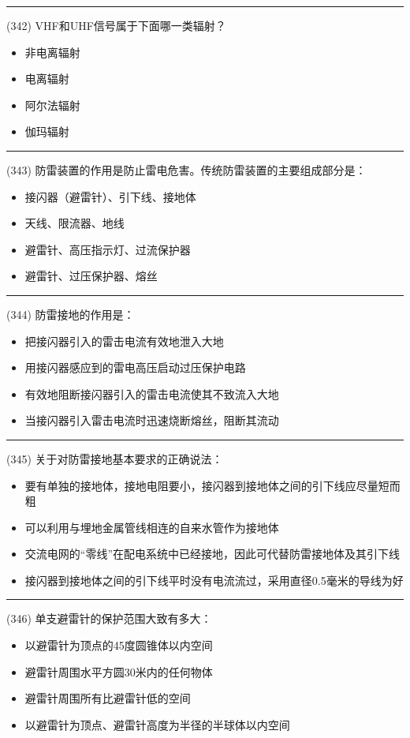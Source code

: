 \documentclass[twocolumn]{ctexart}  %
\begin{document}
\noindent\rule{0.5\textwidth}{1pt}
\heiti (342) VHF和UHF信号属于下面哪一类辐射？ \songti {\color{gray} [LK1235] }
\begin{itemize}
	\item  非电离辐射
	\item  电离辐射
	\item  阿尔法辐射
	\item  伽玛辐射
\end{itemize}


\noindent\rule{0.5\textwidth}{1pt}
\heiti (343) 防雷装置的作用是防止雷电危害。传统防雷装置的主要组成部分是： \songti {\color{gray} [LK0996] }
\begin{itemize}
	\item  接闪器（避雷针）、引下线、接地体
	\item  天线、限流器、地线
	\item  避雷针、高压指示灯、过流保护器
	\item  避雷针、过压保护器、熔丝
\end{itemize}


\noindent\rule{0.5\textwidth}{1pt}
\heiti (344) 防雷接地的作用是： \songti {\color{gray} [LK0997] }
\begin{itemize}
	\item  把接闪器引入的雷击电流有效地泄入大地
	\item  用接闪器感应到的雷电高压启动过压保护电路
	\item  有效地阻断接闪器引入的雷击电流使其不致流入大地
	\item  当接闪器引入雷击电流时迅速烧断熔丝，阻断其流动
\end{itemize}


\noindent\rule{0.5\textwidth}{1pt}
\heiti (345) 关于对防雷接地基本要求的正确说法： \songti {\color{gray} [LK0998] }
\begin{itemize}
	\item  要有单独的接地体，接地电阻要小，接闪器到接地体之间的引下线应尽量短而粗
	\item  可以利用与埋地金属管线相连的自来水管作为接地体
	\item  交流电网的“零线”在配电系统中已经接地，因此可代替防雷接地体及其引下线
	\item  接闪器到接地体之间的引下线平时没有电流流过，采用直径0.5毫米的导线为好
\end{itemize}


\noindent\rule{0.5\textwidth}{1pt}
\heiti (346) 单支避雷针的保护范围大致有多大： \songti {\color{gray} [LK0999] }
\begin{itemize}
	\item  以避雷针为顶点的45度圆锥体以内空间
	\item  避雷针周围水平方圆30米内的任何物体
	\item  避雷针周围所有比避雷针低的空间
	\item  以避雷针为顶点、避雷针高度为半径的半球体以内空间
\end{itemize}
\end{document}
